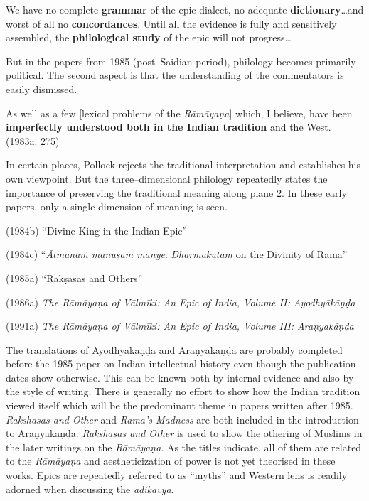 {{\begin{myquote}
We have no complete \textbf{grammar} of the epic dialect, no adequate \textbf{dictionary}…and worst of all no \textbf{concordances}. Until all the evidence is fully and sensitively assembled, the \textbf{philological study} of the epic will not progress…
\end{myquote}

But in the papers from 1985 (post–Saidian period), philology becomes primarily political. The second aspect is that the understanding of the commentators is easily dismissed.

\begin{myquote}
As well as a few [lexical problems of the \textit{Rāmāyaṇa}] which, I believe, have been \textbf{imperfectly understood both in the Indian tradition} and the West. (1983a: 275)
\end{myquote}

In certain places, Pollock rejects the traditional interpretation and establishes his own viewpoint. But the three–dimensional philology repeatedly states the importance of preserving the traditional meaning along plane 2. In these early papers, only a single dimension of meaning is seen.

(1984b) “Divine King in the Indian Epic”

(1984c) “\textit{Ātmānaṁ mānuṣaṁ manye}: \textit{Dharmākūtam} on the Divinity of Rama”

(1985a) “Rākṣasas and Others”

(1986a)\textit{ The Rāmāyaṇa of Vālmīki: An Epic of India, Volume II: Ayodhyākāṇḍa}

(1991a)\textit{ The Rāmāyaṇa of Vālmīki: An Epic of India, Volume III: Araṇyakāṇḍa}

The translations of Ayodhyākāṇḍa and Araṇyakāṇḍa are probably completed before the 1985 paper on Indian intellectual history even though the publication dates show otherwise. This can be known both by internal evidence and also by the style of writing. There is generally no effort to show how the Indian tradition viewed itself which will be the predominant theme in papers written after 1985. \textit{Rakshasas and Other} and \textit{Rama’s Madness} are both included in the introduction to Araṇyakāṇḍa. \textit{Rakshasas and Other} is used to show the othering of Muslims in the later writings on the \textit{Rāmāyaṇa}. As the titles indicate, all of them are related to the \textit{Rāmāyaṇa} and aestheticization of power is not yet theorised in these works. Epics are repeatedly referred to as “myths” and Western lens is readily adorned when discussing the \textit{ādikāvya}.

}}
